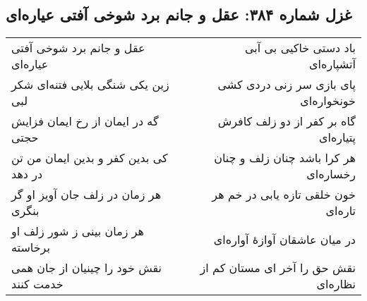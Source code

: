 \begin{center}
\section*{غزل شماره ۳۸۴: عقل و جانم برد شوخی آفتی عیاره‌ای}
\label{sec:384}
\begin{longtable}{l p{0.5cm} r}
عقل و جانم برد شوخی آفتی عیاره‌ای
&&
باد دستی خاکیی بی آبی آتشپاره‌ای
\\
زین یکی شنگی بلایی فتنه‌ای شکر لبی
&&
پای بازی سر زنی دردی کشی خونخواره‌ای
\\
گه در ایمان از رخ ایمان فزایش حجتی
&&
گاه بر کفر از دو زلف کافرش پتیاره‌ای
\\
کی بدین کفر و بدین ایمان من تن در دهد
&&
هر کرا باشد چنان زلف و چنان رخساره‌ای
\\
هر زمان در زلف جان آویز او گر بنگری
&&
خون خلقی تازه یابی در خم هر تاره‌ای
\\
هر زمان بینی ز شور زلف او برخاسته
&&
در میان عاشقان آوازهٔ آواره‌ای
\\
نقش خود را چینیان از جان همی خدمت کنند
&&
نقش حق را آخر ای مستان کم از نظاره‌ای
\\
\end{longtable}
\end{center}
